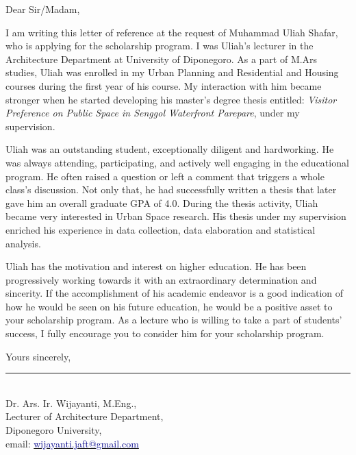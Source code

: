 \documentclass[12pt,a4paper]{letter}
\begin{document}
Dear Sir/Madam,

I am writing this letter of reference at the request of Muhammad Uliah Shafar, who is applying for the scholarship program.
I was Uliah's lecturer in the Architecture Department at University of Diponegoro.
As a part of M.Ars studies, Uliah was enrolled in my Urban Planning and Residential and Housing courses during the first year of his course.
My interaction with him became stronger when he started developing his master's degree thesis entitled: \textit{Visitor Preference on Public Space in Senggol Waterfront Parepare}, under my supervision.

Uliah was an outstanding student, exceptionally diligent and hardworking.
He was always attending, participating, and actively well engaging in the educational program.
He often raised a question or left a comment that triggers a whole class's discussion.
Not only that, he had successfully written a thesis that later gave him an overall graduate GPA of 4.0.
During the thesis activity, Uliah became very interested in Urban Space research.
His thesis under my supervision enriched his experience in data collection, data elaboration and statistical analysis.

Uliah has the motivation and interest on higher education.
He has been progressively working towards it with an extraordinary determination and sincerity.
If the accomplishment of his academic endeavor is a good indication of how he would be seen on his future education, he would be a positive asset to your scholarship program. %
As a lecture who is willing to take a part of students' success, I fully encourage you to consider him for your scholarship program.


Yours sincerely,
\begin{spacing}{1}

\vspace{5em}
\rule{5cm}{1pt} \\%
Dr. Ars. Ir. Wijayanti, M.Eng.,\\
Lecturer of Architecture Department,\\
Diponegoro University,\\
email: \href{mailto:wijayanti.jaft@gmail.com}{\textcolor{darkblue}{wijayanti.jaft@gmail.com}}
\end{spacing}
\end{document}
